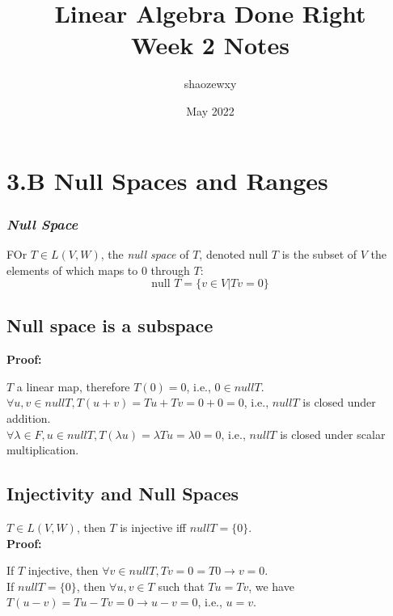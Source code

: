 \documentclass{article}
\title{Linear Algebra Done Right\\
\large{Week 2 Notes}}
\author{shaozewxy }
\date{May 2022}
\begin{document}
\maketitle

\setcounter{secnumdepth}{0}
\section{3.B Null Spaces and Ranges}
\subsubsection{\textit{Null Space}}
FOr $T \in L(V,W)$, the \textit{null space} of $T$, denoted $\textrm{null } T$ is the subset of $V$ the elements of which maps to $0$ through $T$:
\begin{equation*}
    \textrm{null } T = \{v\in V | Tv = 0\}
\end{equation*}
\subsection{Null space is a subspace}
\textbf{Proof:}
\begin{addmargin}[1em]{0em}
$T$ a linear map, therefore $T(0) = 0$, i.e., $0 \in null T$.\\
$\forall u, v \in null T, T(u+v) = Tu + Tv = 0+0 = 0$, i.e., $null T$ is closed under addition.\\
$\forall \lambda \in F, u \in null T, T(\lambda u) = \lambda Tu = \lambda 0 = 0$, i.e., $null T$ is closed under scalar multiplication.
\end{addmargin}
\subsection{Injectivity and Null Spaces}
$T \in L(V, W)$, then $T$ is injective iff $null T = \{0\}$.\\
\textbf{Proof:}\\
\begin{addmargin}[1em]{0em}
If $T$ injective, then $\forall v \in null T, Tv = 0 = T0 \rightarrow v = 0$.\\
If $null T = \{0\}$, then $\forall u, v \in T$ such that $Tu = Tv$, we have $T(u-v) = Tu - Tv = 0 \rightarrow u - v = 0$, i.e., $u = v$.
\end{addmargin}
\end{document}
